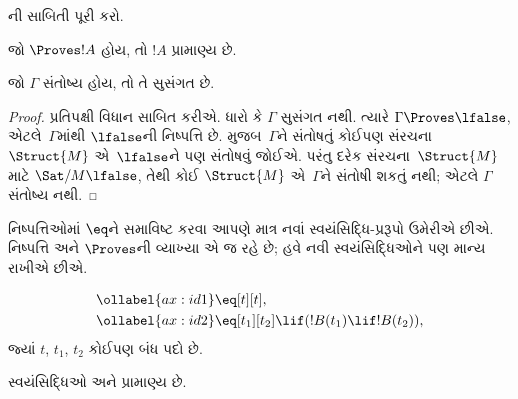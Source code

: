

\begin{prob}
  ની સાબિતી પૂરી કરો.
\end{prob}


\begin{cor}
જો $\Proves !A$ હોય, તો $!A$ પ્રામાણ્ય છે.
\end{cor}

\begin{cor}
જો $\Gamma$ સંતોષ્ય હોય, તો તે સુસંગત છે.
\end{cor}

\begin{proof}
પ્રતિપક્ષી વિધાન સાબિત કરીએ. ધારો કે $\Gamma$ સુસંગત નથી. ત્યારે
$\Gamma \Proves \lfalse$, એટલે~$\Gamma$માંથી $\lfalse$ની
નિષ્પત્તિ છે.  મુજબ~$\Gamma$ને સંતોષતું
કોઈપણ સંરચના~$\Struct{M}$
એ~$\lfalse$ને પણ સંતોષવું જોઈએ. પરંતુ
દરેક સંરચના~$\Struct{M}$ માટે
$\Sat/{M}{\lfalse}$, તેથી કોઈ
$\Struct{M}$ એ~$\Gamma$ને સંતોષી શકતું નથી;
એટલે $\Gamma$ સંતોષ્ય નથી.
\end{proof}
\endgroup


  \begingroup
\makeatletter{}\makeatother


\label{guunit:OLP-0125}


નિષ્પત્તિઓમાં $\eq$ને સમાવિષ્ટ કરવા આપણે માત્ર નવાં
સ્વયંસિદ્ધિ-પ્રરૂપો ઉમેરીએ છીએ. નિષ્પત્તિ અને $\Proves$ની વ્યાખ્યા
એ જ રહે છે; હવે નવી સ્વયંસિદ્ધિઓને પણ માન્ય રાખીએ છીએ.

\begin{defn}[તાદાત્મ્ય માટેની સ્વયંસિદ્ધિઓ]
\begin{align}
\ollabel{ax:id1} & \eq[t][t], \\
\ollabel{ax:id2} & \eq[t_1][t_2] \lif (!B(t_1) \lif
  !B(t_2)),
\end{align}
જ્યાં $t$, $t_1$, $t_2$ કોઈપણ બંધ પદો છે.
\end{defn}

\begin{prop}
  સ્વયંસિદ્ધિઓ  અને  પ્રામાણ્ય છે.
\end{prop}

